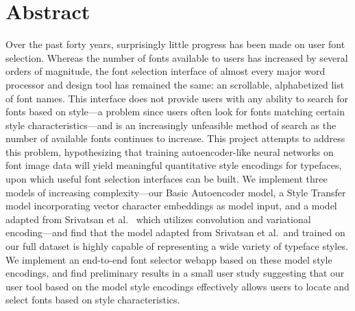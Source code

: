 \chapter*{Abstract}
\label{chap:abstract}

Over the past forty years, surprisingly little progress has been made on user font selection. Whereas the number of fonts available to users has increased by several orders of magnitude, the font selection interface of almost every major word processor and design tool has remained the same: an scrollable, alphabetized list of font names. This interface does not provide users with any ability to search for fonts based on style---a problem since users often look for fonts matching certain style characteristics---and is an increasingly unfeasible method of search as the number of available fonts continues to increase. This project attempts to address this problem, hypothesizing that training autoencoder-like neural networks on font image data will yield meaningful quantitative style encodings for typefaces, upon which useful font selection interfaces can be built. We implement three models of increasing complexity---our Basic Autoencoder model, a Style Transfer model incorporating vector character embeddings as model input, and a model adapted from Srivatsan et al.\ \cite{srivatsan2020} which utilizes convolution and variational encoding---and find that the model adapted from Srivatsan et al.\ and trained on our full dataset is highly capable of representing a wide variety of typeface styles. We implement an end-to-end font selector webapp based on these model style encodings, and find preliminary results in a small user study suggesting that our user tool based on the model style encodings effectively allows users to locate and select fonts based on style characteristics.